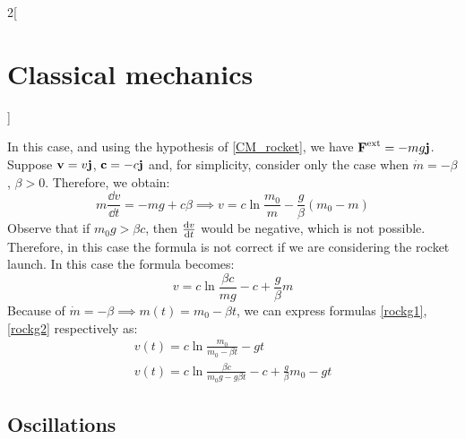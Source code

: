 \documentclass[../../../main.tex]{subfiles}
\begin{document}
\begin{multicols}{2}[\section{Classical mechanics}]
\begin{prop}
  \end{prop}
  \begin{prop}
    In this case, and using the hypothesis of \cref{CM_rocket}, we have $\boldsymbol{\mathrm{F}}^\text{ext}=-mg\boldsymbol{\mathrm{j}}$. Suppose $\boldsymbol{\mathrm{v}}=v\boldsymbol{\mathrm{j}}$, $\boldsymbol{\mathrm{c}}=-c\boldsymbol{\mathrm{j}}$ and, for simplicity, consider only the case when $\dot{m}=-\beta$, $\beta>0$. Therefore, we obtain:
    \begin{equation}
      m\frac{\dd v}{\dd t}=-mg+c\beta\implies v=c\ln\frac{m_0}{m}-\frac{g}{\beta}(m_0-m)
      \label{rockg1}
    \end{equation}
    Observe that if $m_0g>\beta c$, then $\dv{v}{t}$ would be negative, which is not possible. Therefore, in this case the formula is not correct if we are considering the rocket launch. In this case the formula becomes:
    \begin{equation}
      v=c\ln\frac{\beta c}{mg}-c+\frac{g}{\beta}m
      \label{rockg2}
    \end{equation}
    Because of $\dot{m}=-\beta\implies m(t)=m_0-\beta t$, we can express formulas \eqref{rockg1}, \eqref{rockg2} respectively as:
    \begin{gather*}
      v(t)=c\ln\frac{m_0}{m_0-\beta t}-gt\\
      v(t)=c\ln\frac{\beta c}{m_0g-g\beta t}-c+\frac{g}{\beta}m_0-gt
    \end{gather*}
  \end{prop}
  \subsection{Oscillations}

\end{multicols}
\end{document}
